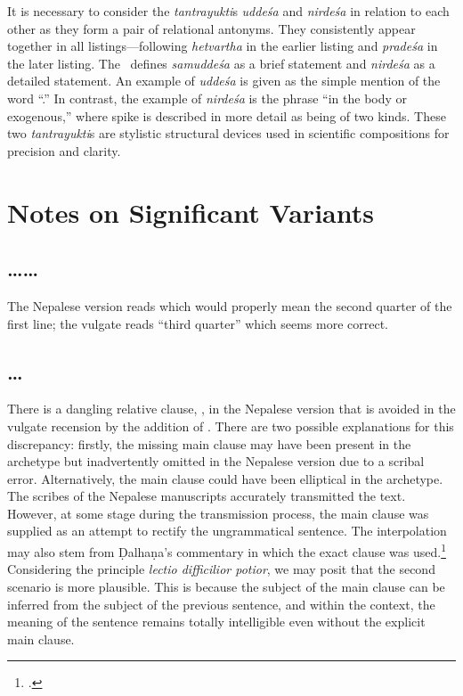 It is necessary to consider the \emph{tantrayukti}s 
\emph{uddeśa} and \emph{nirdeśa} in relation to each other 
as they form a pair of relational antonyms. 
They consistently appear together in all listings---following \emph{hetvartha} 
in the earlier listing and \emph{pradeśa} in the later listing. 
The \SS\ defines \emph{samuddeśa} as a brief statement 
and \emph{nirdeśa} as a detailed statement. 
An example of \emph{uddeśa} is given as the simple mention of the word “.” 
In contrast, the example of \emph{nirdeśa} is the phrase “in the body or exogenous,” 
where spike is described in more detail as being of two kinds. 
These two \emph{tantrayukti}s are stylistic structural devices 
used in scientific compositions for precision and clarity.

\section{Notes on Significant Variants}

\subsection{\ldots{}\ldots}\label{yogan1}
	
The Nepalese version reads  which would
properly mean the second quarter of the first line; the vulgate reads
 “third quarter” which seems more correct.

\subsection{\ldots{}}		

There is a dangling relative clause,
, in the Nepalese version that is avoided in the vulgate
recension by the addition of . 
There are two possible explanations for this discrepancy: 
firstly, the missing main clause may have been present in the archetype 
but inadvertently omitted in the Nepalese version due to a scribal error. 
Alternatively, the main clause could have been elliptical in the archetype. 
The scribes of the Nepalese manuscripts accurately transmitted the text. 
However, at some stage during the transmission process, 
the main clause was supplied as an attempt to rectify the ungrammatical sentence.
The interpolation may also stem from Ḍalhaṇa's commentary in which the exact clause was used.\footnote{
 .}
Considering the principle \emph{lectio difficilior potior}, 
we may posit that the second scenario is more plausible. 
This is because the subject of the main clause can be inferred from 
the subject of the previous sentence, and within the context, 
the meaning of the sentence remains totally intelligible even without the explicit main clause.
	
